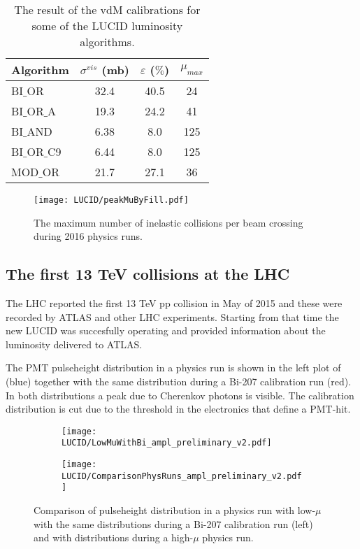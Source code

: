\begin{table}[p]
  \begin{tabular}{|l|c|c|c|}
    Algorithm & $\sigma^{vis}$ (mb) & $\varepsilon$ ($\%$) & $\mu_{max}$ \\
    \hline
    BI$\_$OR & 32.4 & 40.5 & 24 \\
    \hline
    BI$\_$OR$\_$A & 19.3 & 24.2 & 41 \\
    \hline
    BI$\_$AND & 6.38 & 8.0 & 125 \\
    \hline
    BI$\_$OR$\_$C9 & 6.44 & 8.0 & 125 \\
    \hline
    MOD$\_$OR & 21.7 & 27.1 & 36 \\
  \end{tabular}
  \caption{The result of the vdM calibrations for some of the LUCID luminosity algorithms.}
  \label{tab:sigma_vis_efficiency}
\end{table}

\begin{figure}
\centering
\texttt{[image: LUCID/peakMuByFill.pdf]}
\caption{The maximum number of inelastic collisions per beam crossing during 2016 physics runs.}
\label{fig:peakMuByFill}
\end{figure}


\subsection{The first 13 TeV collisions at the LHC}
\label{sec:physics}

The LHC reported the first 13 TeV pp collision in May of 2015 and these were recorded by ATLAS and other LHC experiments. 
Starting from that time the new LUCID was succesfully operating and provided information about the 
luminosity delivered to ATLAS. 

The PMT pulseheight distribution in a physics run is shown in the left plot of  (blue) 
together with the same distribution 
during a Bi-207 calibration run (red). In both distributions a peak due to Cherenkov photons is visible. The 
calibration distribution is cut due to the threshold in the electronics that define a PMT-hit.

\begin{figure}
\centering
\begin{subfigure}{.5\textwidth}
  \centering
  \texttt{[image: LUCID/LowMuWithBi\_ampl\_preliminary\_v2.pdf]}
  \label{fig:sub1}
\end{subfigure}%
\begin{subfigure}{.5\textwidth}
  \centering
  \texttt{[image: LUCID/ComparisonPhysRuns\_ampl\_preliminary\_v2.pdf]}
  \label{fig:sub2}
\end{subfigure}
\caption{Comparison of pulseheight distribution in a physics run with low-$\mu$ with the same distributions 
during a Bi-207 calibration run (left) and with distributions during a high-$\mu$ physics run.}
\label{fig:Pulseheight}
\end{figure}

